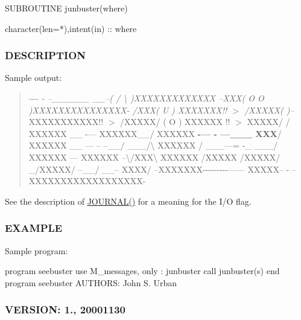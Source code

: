 \begin{DoxyVerb}   SUBROUTINE junbuster(where)

    character(len=*),intent(in) :: where
\end{DoxyVerb}


\subsubsection*{D\+E\+S\+C\+R\+I\+P\+T\+I\+ON}

Sample output\+:

\begin{quote}
{\bfseries ---} {\itshape -\/ {\itshape --\+\_\+\+\_\+\+\_\+\+\_\+\+\_\+\+\_\+ \+\_\+\+\_\+--( / \textbackslash{} )X\+X\+X\+X\+X\+X\+X\+X\+X\+X\+X\+XX} --X\+X\+X(   O   O  )X\+X\+X\+X\+X\+X\+X\+X\+X\+X\+X\+X\+X\+X\+X-\/ /\+X\+XX( U ) X\+X\+X\+X\+X\+X\+X!! $>$ /\+X\+X\+X\+XX( )--} X\+X\+X\+X\+X\+X\+X\+X\+X\+X\+X!! $>$ /\+X\+X\+X\+X\+X/ ( O ) X\+X\+X\+X\+XX !! $>$ X\+X\+X\+X\+X/ / X\+X\+X\+X\+XX \+\_\+\+\_\+ -\/--- X\+X\+X\+X\+X\+X\+\_\+\+\_\+/ X\+X\+X\+X\+XX {\bfseries -\/--- -\/ ---\+\_\+\+\_\+\+\_\+ X\+XX}/ X\+X\+X\+X\+XX \+\_\+\+\_\+ --- -- --\+\_\+\+\_\+/ \+\_\+\+\_\+\+\_\+/\textbackslash{} X\+X\+X\+X\+XX / \+\_\+\+\_\+\+\_\+---= -\/\+\_\+ \+\_\+\+\_\+\+\_\+/ X\+X\+X\+X\+XX \textquotesingle{}--- X\+X\+X\+X\+XX --\textbackslash{}/\+X\+XX\textbackslash{} X\+X\+X\+X\+XX /\+X\+X\+X\+XX  /\+X\+X\+X\+X\+X/  \+\_\+/\+X\+X\+X\+X\+X/ --\+\_\+\+\_\+/ \+\_\+\+\_\+-- X\+X\+X\+X/ --X\+X\+X\+X\+X\+X\+X-\/-\/-\/-\/-\/-\/-\/-\/-\/------ X\+X\+X\+XX-- -\/ --X\+X\+X\+X\+X\+X\+X\+X\+X\+X\+X\+X\+X\+X\+X\+X\+X\+X-\/ \end{quote}


See the description of \hyperlink{M__journal_83_8txt_aee6db01e1c6132b5b3f146b5a0c6e7e1}{J\+O\+U\+R\+N\+A\+L()} for a meaning for the I/O flag.

\subsubsection*{E\+X\+A\+M\+P\+LE}

Sample program\+:

program seebuster use M\+\_\+messages, only \+: junbuster call junbuster(\textquotesingle{}s\textquotesingle{}) end program seebuster A\+U\+T\+H\+O\+RS\+: John S. Urban \subsubsection*{V\+E\+R\+S\+I\+ON\+: 1., 20001130}


